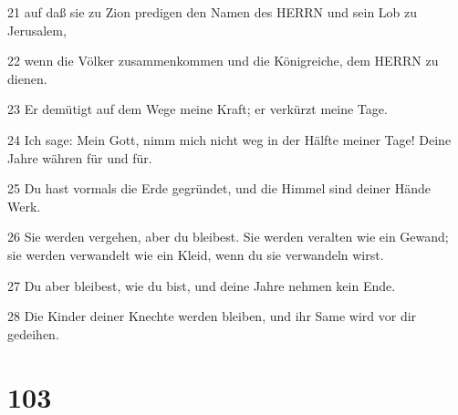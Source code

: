 \par 21 auf daß sie zu Zion predigen den Namen des HERRN und sein Lob zu Jerusalem,
\par 22 wenn die Völker zusammenkommen und die Königreiche, dem HERRN zu dienen.
\par 23 Er demütigt auf dem Wege meine Kraft; er verkürzt meine Tage.
\par 24 Ich sage: Mein Gott, nimm mich nicht weg in der Hälfte meiner Tage! Deine Jahre währen für und für.
\par 25 Du hast vormals die Erde gegründet, und die Himmel sind deiner Hände Werk.
\par 26 Sie werden vergehen, aber du bleibest. Sie werden veralten wie ein Gewand; sie werden verwandelt wie ein Kleid, wenn du sie verwandeln wirst.
\par 27 Du aber bleibest, wie du bist, und deine Jahre nehmen kein Ende.
\par 28 Die Kinder deiner Knechte werden bleiben, und ihr Same wird vor dir gedeihen.

\chapter{103}

